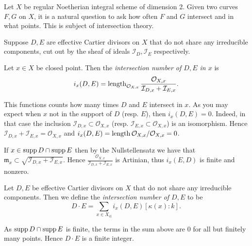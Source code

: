 Let $X$ be regular Noetherian integral scheme of dimension 2. 
Given two curves $F, G$ on $X$, it is a natural question to ask how often $F$ and $G$ intersect and in what points. 
This is subject of intersection theory. 

\begin{definition}
	Suppose $D, E$ are effective Cartier divisors on $X$ that do not share any irreducible components, cut out by the sheaf of ideals $\mathcal{I} _D, \mathcal{I} _E$ respectively.

	Let $x \in X$ be closed point. Then the \emph{intersection number of $D, E$ in $x$} is \[
		i_x(D, E) = \operatorname{length}_{\mathcal{O}_{X, x}} \frac{\mathcal{O}_{X, x}}{\mathcal{I}_{D,x} + \mathcal{I}_{E,x}} 
	.\]  
\end{definition}

This functions counts how many times $ D$ and $E$ intersect in $x$. 
As you may expect when  $x$ not in the support of $D$ (resp. $E$), then $i_x(D, E) = 0$. 
Indeed, in that case the inclusion $\mathcal{I}_{D, x} \subset  \mathcal{O}_{X, x}$ (resp. $\mathcal{I} _{E, x}\subset \mathcal{O}_{X,x}$) is an isomorphism. 
Hence $\mathcal{I}_{D, x} + \mathcal{I} _{E, x} = \mathcal{O}_{X, x}$ and $i_x(D, E) = \operatorname{length} \mathcal{O}_{X, x} /\mathcal{O}_{X, x} = 0$. 

If $x \in \operatorname{supp} D \cap \operatorname{supp} E$ then by the Nullstellensatz we have that $\mathfrak{m} _x \subset  \sqrt{\mathcal{I} _{D, x} + \mathcal{I} _{E, x}} $. 
Hence $\frac{\mathcal{O}_{X, x}}{\mathcal{I}_{D,x} + \mathcal{I}_{E,x}}$ is Artinian, thus $i_x(E, D)$ is finite and nonzero. 

\begin{definition}\label{def:intersection_number_effective}
	Let $D, E$ be effective Cartier divisors on $X$ that do not share any irreducible components.
	Then we define the \emph{intersection number of $D, E$} to be \[
		D\cdot E = \sum_{x \in X_\text{cl} }i_x (D, E)[\kappa(x): k]
	.\] 
\end{definition}
As $\operatorname{supp} D \cap \operatorname{supp} E$ is finite, the terms in the sum above are $0$ for all but finitely many points. Hence $D\cdot E$ is a finite integer. 

